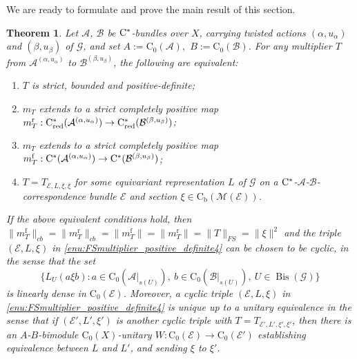 \documentclass[11 pt, leqno]{amsart}
\numberwithin{equation}{section}
\theoremstyle{plain}
\newtheorem{thm}{Theorem}[section]
\theoremstyle{definition}
\newcommand*{\contz}{\mathrm{C_0}}%
\newcommand*{\contb}{\mathrm{C_b}}%
\DeclareMathOperator{\red}{red}%
\DeclareMathOperator{\rd}{r}%
\DeclareMathOperator{\f}{f}%
\DeclareMathOperator{\Bis}{Bis}
\newcommand{\B}{\mathcal B}
\newcommand{\M}{\mathcal M}
\newcommand{\m}{m}
\newcommand{\G}{\mathcal G} %
\newcommand{\EE}{\mathcal E}
\newcommand{\A}{\mathcal A}
\newcommand{\cst}{\ifmmode\mathrm{C}^*\else{$\mathrm{C}^*$}\fi}
\begin{document}
We are ready to formulate and prove the main result of this section.

\begin{thm}\label{thm:FSmultiplier_positive_definite}
Let $\A$, $\B$ be $\cst$-bundles over $X$, carrying twisted actions $(\alpha,u_\alpha)$ and $(\beta,u_\beta)$ of $\G$, and set $A:=\contz(\A),$ $B:=\contz(\B)$. 
For any multiplier $T$ from $\A^{(\alpha,u_{\alpha})}$ to $\B^{(\beta,u_{\beta})}$, the following are equivalent: 
\begin{enumerate}
	\item\label{enu:FSmultiplier_positive_definite1} $T$ is  strict, bounded and positive-definite;
    \item\label{enu:FSmultiplier_positive_definite2} $\m_T$ %
	extends to a strict completely positive map $\m_T^{\rd} : \cst_{\red}(\A^{(\alpha,u_{\alpha})}) \to \cst_{\red}(\B^{(\beta,u_{\beta})})$;
	\item\label{enu:FSmultiplier_positive_definite3} $\m_T$ %
	extends to a strict completely positive map $\m_T^{\f}:\cst(\A^{(\alpha,u_{\alpha})}) \to \cst(\B^{(\beta,u_{\beta})})$;
	\item\label{enu:FSmultiplier_positive_definite4} $T = T_{\EE,L,\xi,\xi}$ %
	for some equivariant representation $L$ of $\G$ on a $\cst$-$\A$-$\B$-correspondence bundle $\EE$ and section $\xi\in \contb(\M(\EE))$.
\end{enumerate}	
If the above equivalent conditions hold, then  $\| \m_T^{\f} \|_{cb} = \| \m_T^{\rd} \|_{cb} = \| \m_T^{\f} \| = \| \m_T^{\rd} \| = \| T \|_{FS} = \| \xi \|^2$ and the triple $(\EE,L,\xi)$ in \ref{enu:FSmultiplier_positive_definite4} can be chosen to be cyclic, in the sense that the set
\[
    \{ L_U (a \xi b) : a \in \contz(\A|_{s(U)}) ,\ b \in \contz(\B|_{s(U)}) ,\ U\in \Bis(\G) \}
\]
is linearly dense in $\contz(\EE)$. 
Moreover, a cyclic triple $(\EE,L,\xi)$ in \ref{enu:FSmultiplier_positive_definite4} is unique up to a unitary equivalence in the sense that if  $(\EE',L',\xi')$ is another cyclic triple with $T=T_{\EE',L',\xi',\xi'}$, then there is an $A$-$B$-bimodule $\contz(X)$-unitary $W:\contz(\EE)\to \contz (\EE')$ establishing equivalence between $L$ and $L'$, and sending $\xi$ to $\xi'$.
\end{thm}
\end{document}
